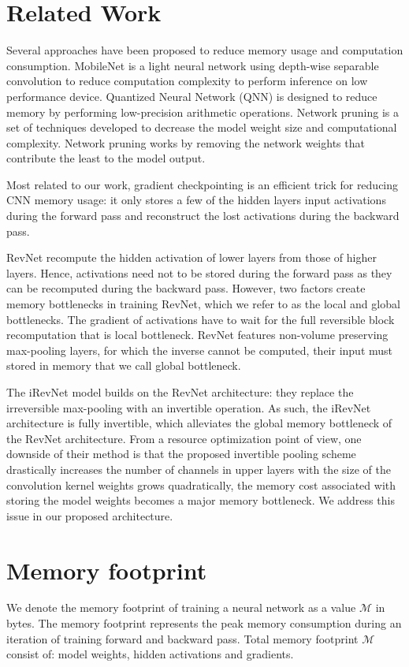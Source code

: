 \documentclass[10pt,twocolumn,letterpaper]{article}
\begin{document}
\section{Related Work}
Several approaches have been proposed to reduce memory usage and computation consumption. MobileNet\cite{howard2017mobilenets} is a light neural network using depth-wise separable convolution to reduce computation complexity to perform inference on low performance device. Quantized Neural Network (QNN)\cite{hubara2017quantized} is designed to reduce memory by performing low-precision arithmetic operations. Network pruning\cite{molchanov2016pruning} is a set of techniques developed to decrease the model weight size and computational complexity. Network pruning works by removing the network weights that contribute the least to the model output.
	
Most related to our work, gradient checkpointing is an efficient trick for reducing CNN memory usage: it only stores a few of the hidden layers input activations during the forward pass and reconstruct the lost activations during the backward pass.
	
RevNet recompute the hidden activation of lower layers from those of higher layers. Hence, activations need not to be stored during the forward pass as they can be recomputed during the backward pass. However, two factors create memory bottlenecks in training RevNet, which we refer to as the local and global bottlenecks. The gradient of activations have to wait for the full reversible block recomputation that is local bottleneck. RevNet features non-volume preserving max-pooling layers, for which the inverse cannot be computed, their input must stored in memory that we call global bottleneck. 

The iRevNet \cite{jacobsen2018revnet} model builds on the RevNet architecture: they replace the irreversible max-pooling with an invertible operation. As such, the iRevNet architecture is fully invertible, which alleviates the global memory bottleneck of the RevNet architecture. From a resource optimization point of view, one downside of their method is that the proposed invertible pooling scheme drastically increases the number of channels in upper layers with the size of the convolution kernel weights grows quadratically, the memory cost associated with storing the model weights becomes a major memory bottleneck. We address this issue in our proposed architecture.



\section{Memory footprint}
We denote the memory footprint of training a neural network as a value $\mathcal{M}$ in bytes. The memory footprint represents the peak memory consumption during an iteration of training forward and backward pass. Total memory footprint  $\mathcal{M}$ consist of:  model weights, hidden activations and gradients.
    
\end{document}

